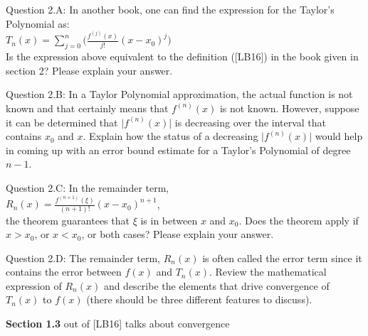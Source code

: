 \documentclass{article}
\renewcommand{\cite}[1]{[#1]}
\def\ds{\displaystyle}
\begin{document}
\par \medskip \noindent
%
Question 2.A: In another book, one can find the expression for the Taylor's Polynomial as: \\
$\ds T_n(x) = \sum_{j=0}^n \biggr ( \frac {f^{(j)}(x)}{j!}(x-x_0)^j \biggr )$  \\
Is the expression above equivalent to the definition ([LB16]) in the book given in section 2?  Please explain your answer. \medskip \par \noindent
%
Question 2.B: In a Taylor Polynomial approximation, the actual function is not known and that certainly means that $\ds f^{(n)}(x)$ is not known. However, suppose it can be determined that  $\ds \vert f^{(n)}(x)\vert $ is decreasing over the interval that contains $x_0$ and $x$. Explain how the status of a decreasing $\ds \vert f^{(n)}(x)\vert $ would help in coming up with an error bound estimate for a Taylor's Polynomial of degree $n-1$.   \medskip \par \noindent
%
Question 2.C: In the remainder term, \\
$\ds R_n(x) =  \frac {f^{(n+1)}(\xi)}{(n+1)!}(x-x_0)^{n+1} $,  \\
the theorem guarantees that $\xi$ is in between $x$ and $\ds x_0$. Does the theorem apply if $\ds x>x_0$, or $\ds x<x_0$, or both cases? Please explain your answer. 
\medskip \par \noindent
%
Question 2.D: The remainder term, $R_n(x)$  is often called the error term since it contains the error between $f(x)$ and $\ds T_n(x)$. Review the mathematical expression of $\ds R_n(x)$ and describe the elements that drive convergence of $\ds T_n(x)$ to $f(x)$ (there should be three different features to discuss).
\par \bigskip \par
{\bf Section 1.3} out of \cite{LB16} talks about convergence\\  \par \medskip \noindent
 
\end{document}
